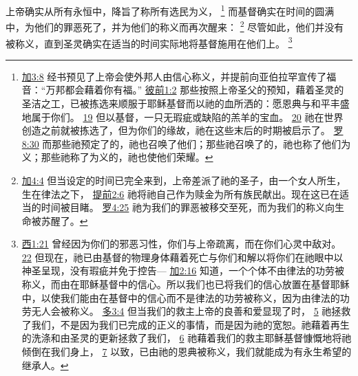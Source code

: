 \documentclass[12pt, a4paper, oneside]{ctexart}
\newcounter{parnum}[section]
\newcommand{\N}{%
   \noindent\refstepcounter{parnum}%
    \makebox[\parindent][l]{\textbf{\arabic{parnum}.}}}
\begin{document}
\N 上帝确实从所有永恒中，降旨了称所有选民为义，
	\footnote {
		\href{https://biblehub.com/galatians/3-8.htm}{加3:8} 经书预见了上帝会使外邦人由信心称义，并提前向亚伯拉罕宣传了福音：“万邦都会藉着你有福。”
		\href{https://biblehub.com/1_peter/1-2.htm}{彼前1:2} 那些按照上帝圣父的预知，藉着圣灵的圣洁之工，已被拣选来顺服于耶稣基督而以祂的血所洒的：愿恩典与和平丰盛地属于你们。
		\href{https://biblehub.com/1_peter/1-19.htm}{19} 但以基督，一只无瑕疵或缺陷的羔羊的宝血。
		\href{https://biblehub.com/1_peter/1-20.htm}{20} 祂在世界创造之前就被拣选了，但为你们的缘故，祂在这些末后的时期被启示了。
		\href{https://biblehub.com/romans/8-30.htm}{罗8:30} 而那些祂预定了的，祂也召唤了他们；那些祂召唤了的，祂也称了他们为义；那些祂称了为义的，祂也使他们荣耀。
	}
	而基督确实在时间的圆满中，为他们的罪恶死了，并为他们的称义而再次醒来：
	\footnote {
		\href{https://biblehub.com/galatians/4-4.htm}{加4:4} 但当设定的时间已完全来到，上帝差派了祂的圣子，由一个女人所生，生在律法之下，
		\href{https://biblehub.com/1_timothy/2-6.htm}{提前2:6} 祂将祂自己作为赎金为所有族民献出。现在这已在适当的时间被目睹。
		\href{https://biblehub.com/romans/4-25.htm}{罗4:25} 祂为我们的罪恶被移交至死，而为我们的称义向生命被苏醒了。
	}
	尽管如此，他们并没有被称义，直到圣灵确实在适当的时间实际地将基督施用在他们上。
	\footnote {
		\href{https://biblehub.com/colossians/1-21.htm}{西1:21} 曾经因为你们的邪恶习性，你们与上帝疏离，而在你们心灵中敌对。
		\href{https://biblehub.com/colossians/1-22.htm}{22} 但现在，祂已由基督的物理身体藉着死亡与你们和解以将你们在祂眼中以神圣呈现，没有瑕疵并免于控告---
		\href{https://biblehub.com/galatians/2-16.htm}{加2:16} 知道，一个个体不由律法的功劳被称义，而由在耶稣基督中的信心。所以我们也已将我们的信心放置在基督耶稣中，以使我们能由在基督中的信心而不是律法的功劳被称义，因为由律法的功劳无人会被称义。
		\href{https://biblehub.com/titus/3-4.htm}{多3:4} 但当我们的救主上帝的良善和爱显现了时，
		\href{https://biblehub.com/titus/3-5.htm}{5} 祂拯救了我们，不是因为我们已完成的正义的事情，而是因为祂的宽恕。祂藉着再生的洗涤和由圣灵的更新拯救了我们，
		\href{https://biblehub.com/titus/3-6.htm}{6} 祂藉着我们的救主耶稣基督慷慨地将祂倾倒在我们身上，
		\href{https://biblehub.com/titus/3-7.htm}{7} 以致，已由祂的恩典被称义，我们就能成为有永生希望的继承人。
	}
\end{document}
